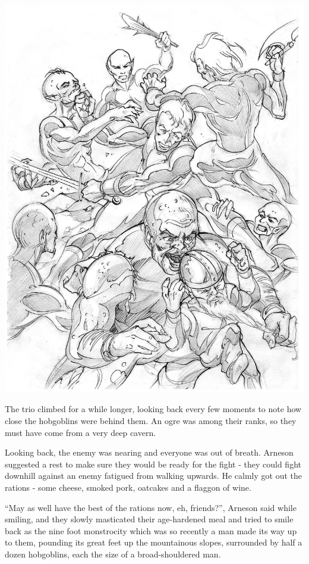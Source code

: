 \documentclass[titlepage,a4paper,openany]{book}
\begin{document}
\begin{multicols}{2}
{\begin{exampletext}
	\includegraphics[width=\linewidth]{images/Boris_Pecikozic/nura_brawl.jpg}
	\label{boris:brawl}

	The trio climbed for a while longer, looking back every few moments to note how close the hobgoblins were behind them. An ogre was among their ranks, so they must have come from a very deep cavern.

	Looking back, the enemy was nearing and everyone was out of breath. Arneson suggested a rest to make sure they would be ready for the fight - they could fight downhill against an enemy fatigued from walking upwards. He calmly got out the rations - some cheese, smoked pork, oatcakes and a flaggon of wine.

	``May as well have the best of the rations now, eh, friends?'', Arneson said while smiling, and they slowly masticated their age-hardened meal and tried to smile back as the nine foot monstrocity which was so recently a man made its way up to them, pounding its great feet up the mountainous slopes, surrounded by half a dozen hobgoblins, each the size of a broad-shouldered man.


\end{exampletext}}
\end{multicols}
\end{document}
